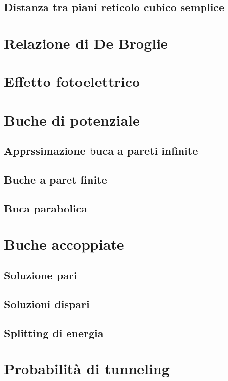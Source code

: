\documentclass[10pt,a4paper]{report}
\begin{document}
	\section{Distanza tra piani reticolo cubico semplice}

\chapter{Relazione di De Broglie}

\chapter{Effetto fotoelettrico}

\chapter{Buche di potenziale}

	\section{Apprssimazione buca a pareti infinite}

	\section{Buche a paret finite}

	\section{Buca parabolica}


\chapter{Buche accoppiate}

	\section{Soluzione pari}

	\section{Soluzioni dispari}

	\section{Splitting di energia}


\chapter{Probabilità di tunneling}
\end{document}
